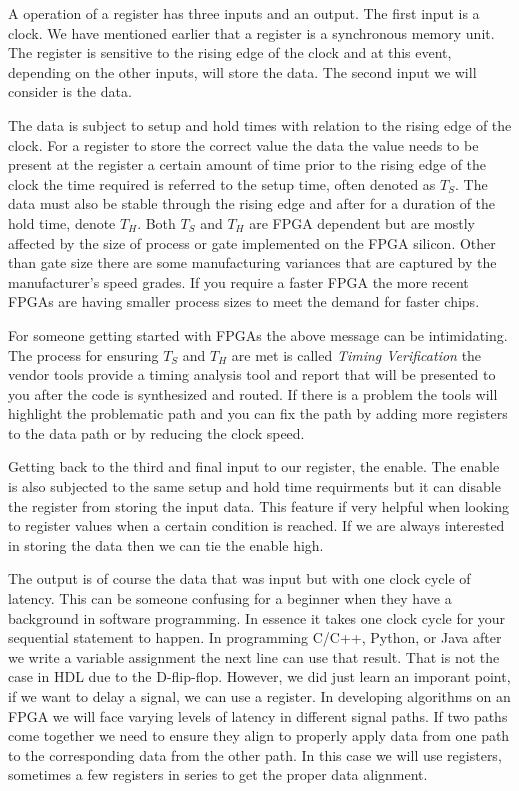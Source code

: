 A operation of a register has three inputs and an output. The first input is a clock. We have mentioned earlier that a register is a synchronous memory unit. The register is sensitive to the rising edge of the clock and at this event, depending on the other inputs, will store the data. The second input we will consider is the data. 

The data is subject to setup and hold times with relation to the rising edge of the clock. For a register to store the correct value the data the value needs to be present at the register a certain amount of time prior to the rising edge of the clock the time required is referred to the setup time, often denoted as $T_S$. The data must also be stable through the rising edge and after for a duration of the hold time, denote $T_H$. Both $T_S$ and $T_H$ are \ac{FPGA} dependent but are mostly affected by the size of process or gate implemented on the \ac{FPGA} silicon. Other than gate size there are some manufacturing variances that are captured by the manufacturer's speed grades. If you require a faster \ac{FPGA} the more recent \ac{FPGA}s are having smaller process sizes to meet the demand for faster chips. 

For someone getting started with \ac{FPGA}s the above message can be intimidating. The process for ensuring $T_S$ and $T_H$ are met is called \emph{Timing Verification} the vendor tools provide a timing analysis tool and report that will be presented to you after the code is synthesized and routed. If there is a problem the tools will highlight the problematic path and you can fix the path by adding more registers to the data path or by reducing the clock speed. 

Getting back to the third and final input to our register, the enable. The enable is also subjected to the same setup and hold time requirments but it can disable the register from storing the input data. This feature if very helpful when looking to register values when a certain condition is reached. If we are always interested in storing the data then we can tie the enable high.

The output is of course the data that was input but with one clock cycle of latency. This can be someone confusing for a beginner when they have a background in software programming. In essence it takes one clock cycle for your sequential statement to happen. In programming C/C++, Python, or Java after we write a variable assignment the next line can use that result. That is not the case in \ac{HDL} due to the D-flip-flop. However, we did just learn an imporant point, if we want to delay a signal, we can use a register. In developing algorithms on an \ac{FPGA} we will face varying levels of latency in different signal paths. If two paths come together we need to ensure they align to properly apply data from one path to the corresponding data from the other path. In this case we will use registers, sometimes a few registers in series to get the proper data alignment. 

